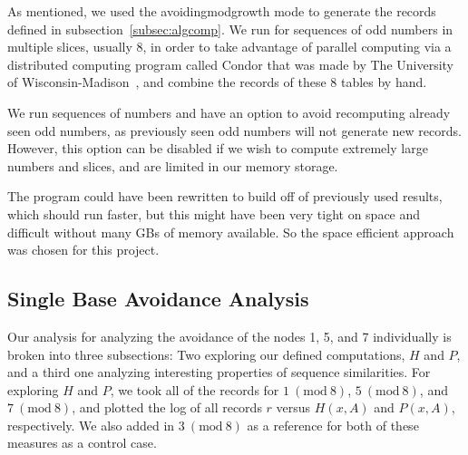 \documentclass[12pt]{article}
\newcommand{\Mod}[1]{\ (\mathrm{mod}\ #1)}
\theoremstyle{definition}
\begin{document}
As mentioned, we used the avoidingmodgrowth mode to generate the records defined in subsection~\ref{subsec:algcomp}. We run for sequences of odd numbers in multiple slices, usually 8, in order to take advantage of parallel computing via a distributed computing program called Condor that was made by The University of Wisconsin-Madison~\cite{Thain:2005:DCP:1064323.1064336}, and combine the records of these 8 tables by hand. \par
We run sequences of numbers and have an option to avoid recomputing already seen odd numbers, as previously seen odd numbers will not generate new records. However, this option can be disabled if we wish to compute extremely large numbers and slices, and are limited in our memory storage. \par
The program could have been rewritten to build off of previously used results, which should run faster, but this might have been very tight on space and difficult without many GBs of memory available. So the space efficient approach was chosen for this project.
\subsection{Single Base Avoidance Analysis} \label{subsec:algsinglebase}
Our analysis for analyzing the avoidance of the nodes 1, 5, and 7 individually is broken into three subsections: Two exploring our defined computations, $H$ and $P$, and a third one analyzing interesting properties of sequence similarities.
For exploring $H$ and $P$, we took all of the records for $1 \Mod{8}$, $5 \Mod{8}$, and $7 \Mod{8}$, and plotted the log of all records $r$ versus $H(x,A)$ and $P(x,A)$, respectively. We also added in $3 \Mod{8}$ as a reference for both of these measures as a control case.
\end{document}
